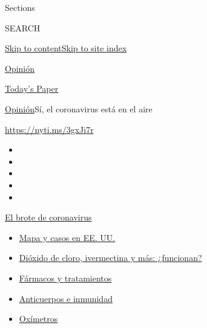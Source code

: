 Sections

SEARCH

\protect\hyperlink{site-content}{Skip to
content}\protect\hyperlink{site-index}{Skip to site index}

\href{https://www.nytimes3xbfgragh.onion/es/section/opinion}{Opinión}

\href{https://myaccount.nytimes3xbfgragh.onion/auth/login?response_type=cookie\&client_id=vi}{}

\href{https://www.nytimes3xbfgragh.onion/section/todayspaper}{Today's
Paper}

\href{/es/section/opinion}{Opinión}\textbar{}Sí, el coronavirus está en
el aire

\url{https://nyti.ms/3gxJi7r}

\begin{itemize}
\item
\item
\item
\item
\item
\end{itemize}

\href{https://www.nytimes3xbfgragh.onion/es/spotlight/coronavirus?action=click\&pgtype=Article\&state=default\&region=TOP_BANNER\&context=storylines_menu}{El
brote de coronavirus}

\begin{itemize}
\tightlist
\item
  \href{https://www.nytimes3xbfgragh.onion/es/interactive/2020/espanol/mundo/coronavirus-en-estados-unidos.html?action=click\&pgtype=Article\&state=default\&region=TOP_BANNER\&context=storylines_menu}{Mapa
  y casos en EE. UU.}
\item
  \href{https://www.nytimes3xbfgragh.onion/es/2020/07/23/espanol/america-latina/bolivia-cloro-coronavirus-ivermectina.html?action=click\&pgtype=Article\&state=default\&region=TOP_BANNER\&context=storylines_menu}{Dióxido
  de cloro, ivermectina y más: ¿funcionan?}
\item
  \href{https://www.nytimes3xbfgragh.onion/es/interactive/2020/science/coronavirus-tratamientos-curas.html?action=click\&pgtype=Article\&state=default\&region=TOP_BANNER\&context=storylines_menu}{Fármacos
  y tratamientos}
\item
  \href{https://www.nytimes3xbfgragh.onion/es/2020/07/28/espanol/ciencia-y-tecnologia/anticuerpos-coronavirus-inmunidad.html?action=click\&pgtype=Article\&state=default\&region=TOP_BANNER\&context=storylines_menu}{Anticuerpos
  e inmunidad}
\item
  \href{https://www.nytimes3xbfgragh.onion/es/2020/04/29/espanol/estilos-de-vida/oximetro-para-que-sirve.html?action=click\&pgtype=Article\&state=default\&region=TOP_BANNER\&context=storylines_menu}{Oxímetros}
\end{itemize}

